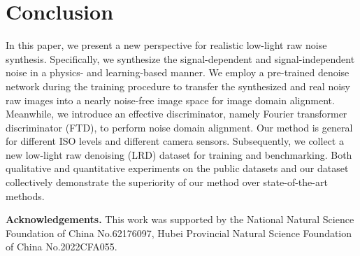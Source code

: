 \documentclass[10pt,twocolumn,letterpaper]{article}
\begin{document}
\section{Conclusion}
\label{conclusion}
In this paper, we present a new perspective for realistic low-light raw noise synthesis. Specifically, we synthesize the signal-dependent and signal-independent noise in a physics- and learning-based manner. We employ a pre-trained denoise network during the training procedure to transfer the synthesized and real noisy raw images into a nearly noise-free image space for image domain alignment. Meanwhile, we introduce an effective discriminator, namely Fourier transformer discriminator (FTD), to perform noise domain alignment. Our method is general for different ISO levels and different camera sensors. Subsequently, we collect a new low-light raw denoising (LRD) dataset for training and benchmarking. Both qualitative and quantitative experiments on the public datasets and our dataset collectively demonstrate the superiority of our method over state-of-the-art methods.

\textbf{Acknowledgements.} This work was supported by the National Natural Science Foundation of China No.62176097, Hubei Provincial Natural Science Foundation of China No.2022CFA055.

{\small


}
\end{document}
